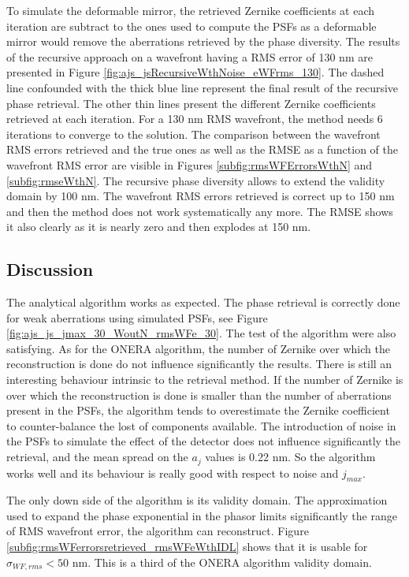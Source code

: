To simulate the deformable mirror, the retrieved Zernike coefficients at each iteration are subtract to the ones used to compute the PSFs as a deformable mirror would remove the aberrations retrieved by the phase diversity. The results of the recursive approach on a wavefront having a RMS error of 130 nm are presented in Figure \ref{fig:ajs_jsRecursiveWthNoise_eWFrms_130}. The dashed line confounded with the thick blue line represent the final result of the recursive phase retrieval. The other thin lines present the different Zernike coefficients retrieved at each iteration. For a 130 nm RMS wavefront, the method needs 6 iterations to converge to the solution. The comparison between the wavefront RMS errors retrieved and the true ones as well as the RMSE as a function of the wavefront RMS error are visible in Figures \ref{subfig:rmsWFErrorsWthN} and \ref{subfig:rmseWthN}. The recursive phase diversity allows to extend the validity domain by 100 nm. The wavefront RMS errors retrieved is correct up to 150 nm and then the method does not work systematically any more. The RMSE shows it also clearly as it is nearly zero and then explodes at 150 nm.

\subsection{Discussion}
\label{subsec:DiscussionOurPD}

The analytical algorithm works as expected. The phase retrieval is correctly done for weak aberrations using simulated PSFs, see Figure \ref{fig:ajs_js_jmax_30_WoutN_rmsWFe_30}. The test of the algorithm were also satisfying. As for the ONERA algorithm, the number of Zernike over which the reconstruction is done do not influence significantly the results. There is still an interesting behaviour intrinsic to the retrieval method. If the number of Zernike is over which the reconstruction is done is smaller than the number of aberrations present in the PSFs, the algorithm tends to overestimate the Zernike coefficient to counter-balance the lost of components available. The introduction of noise in the PSFs to simulate the effect of the detector does not influence significantly the retrieval, and the mean spread on the $a_j$ values is 0.22 nm. So the algorithm works well and its behaviour is really good with respect to noise and $j_{max}$.

The only down side of the algorithm is its validity domain. The approximation used to expand the phase exponential in the phasor limits significantly the range of RMS wavefront error, the algorithm can reconstruct. Figure \ref{subfig:rmsWFerrorsretrieved_rmsWFeWthIDL} shows that it is usable for $\sigma_{WF,rms} < 50$ nm. This is a third of the ONERA algorithm validity domain.

